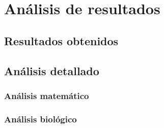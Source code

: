 \chapter{Análisis de resultados}


\section{Resultados obtenidos}

\section{Análisis detallado}

\subsection{Análisis matemático}

\subsection{Análisis biológico}
